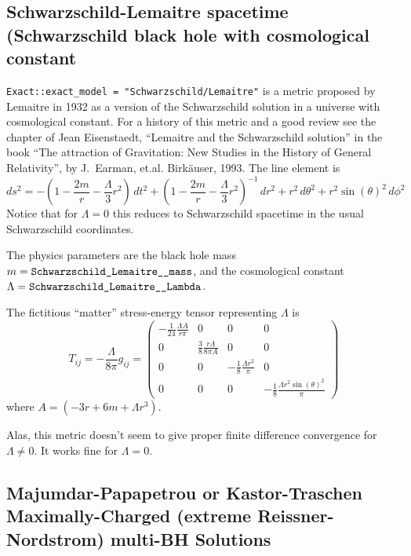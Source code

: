 
\subsection{Schwarzschild-Lemaitre spacetime
	    (Schwarzschild black hole with cosmological constant}

\verb|Exact::exact_model = "Schwarzschild/Lemaitre"|%
is a metric proposed by Lemaitre in 1932 as a version of the
Schwarzschild solution in a universe with cosmological constant.
For a history of this metric and a good review see the chapter of
Jean Eisenstaedt, ``Lemaitre and the Schwarzschild solution'' in the
book ``The attraction of Gravitation: New Studies in the History of
General Relativity'', by J.~Earman, et.al.  Birk\"{a}user, 1993.
The line element is 
\begin{equation}
ds^2 = - \left( 1-\frac{2m}{r} - \frac{\Lambda}{3}r^2\right) \, dt^2
       + \left( 1-\frac{2m}{r} -\frac{\Lambda}{3}r^2 \right)^{-1} \, dr^2
       + r^2 \, d\theta^2
       + r^2 \sin(\theta)^2 \, d\phi^2
\end{equation}
Notice that for $\Lambda = 0$ this reduces to Schwarzschild spacetime
in the usual Schwarzschild coordinates.

The physics parameters are the black hole mass
$m = \verb|Schwarzschild_Lemaitre__mass|$, and the
cosmological constant $\Lambda = \verb|Schwarzschild_Lemaitre__Lambda|$.

The fictitious ``matter'' stress-energy tensor representing $\Lambda$ is
\begin{equation}
T_{ij}= - \frac{\Lambda}{8 \pi} g_{ij}
      = \left(
	\begin{array}{cccc}
	-\frac{1}{24}\frac{\Lambda A}{r\pi} & 0 & 0 & 0\\
	0 & \frac{3}{8}\frac{r\Lambda}{8\pi A }& 0 & 0\\
	0 & 0 &-\frac{1}{8}\frac{\Lambda r^2}{\pi }&  0\\
	0 & 0 & 0 & -\frac{1}{8}\frac{\Lambda r^2 \sin(\theta)^2}{\pi}
	\end{array}
	\right)
\end{equation}
where $A = (-3r +6m+\Lambda r^3)$.

Alas, this metric doesn't seem to give proper finite difference
convergence for $\Lambda \ne 0$.  It works fine for $\Lambda = 0$.


\subsection{Majumdar-Papapetrou or Kastor-Traschen
	    Maximally-Charged (extreme Reissner-Nordstrom) multi-BH Solutions}

